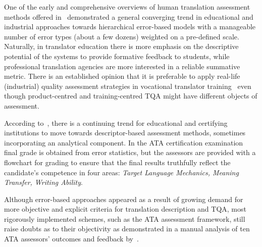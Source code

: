 One of the early and comprehensive overviews of human translation assessment methods offered in~\citet{Secara2005} demonstrated a general converging trend in educational and industrial approaches towards hierarchical error-based models with a manageable number of error types (about a few dozens) weighted on a pre-defined scale. Naturally, in translator education there is more emphasis on the descriptive potential of the systems to provide formative feedback to students, while professional translation agencies are more interested in a reliable summative metric. 
There is an established opinion that it is preferable to apply real-life (industrial) quality assessment strategies in vocational translator training~\cite{Doyle2003, Koby2005, Williams2013} even though product-centred and training-centred TQA might have different objects of assessment. 

According to~\citet{Hegrenaes2020}, there is a continuing trend for educational and certifying institutions to move towards descriptor-based assessment methods, sometimes incorporating an analytical component. In the \gls{ATA} certification examination final grade is obtained from error statistics, but the assessors are provided with a flowchart for grading to ensure that the final results truthfully reflect the candidate's competence in four areas: \textit{Target Language Mechanics, Meaning Transfer, Writing Ability}. 

Although error-based approaches appeared as a result of growing demand for more objective and explicit criteria for translation description and TQA, most rigorously implemented schemes, such as the ATA assessment framework, still raise doubts as to their objectivity as demonstrated in a manual analysis of ten ATA assessors' outcomes and feedback by~\citet{Phelan2017}. 

